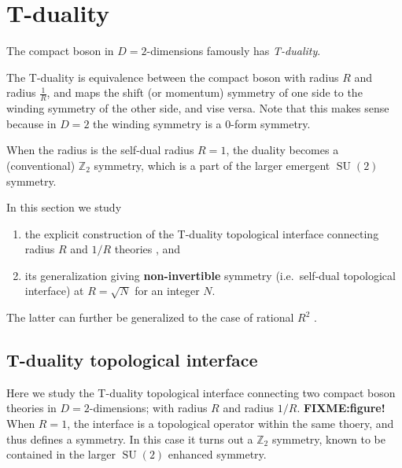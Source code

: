 \documentclass[
  letterpaper,
  DIV=11,
  numbers=noendperiod]{scrreport}
\providecommand{\tightlist}{%
  \setlength{\itemsep}{0pt}\setlength{\parskip}{0pt}}\usepackage{longtable,booktabs,array}
\DeclareMathOperator{\SU}{SU}
\newcommand{\stdim}{D}
\begin{document}
\hypertarget{t-duality}{%
\section{T-duality}\label{t-duality}}

The compact boson in \(\stdim=2\)-dimensions famously has
\emph{T-duality}.

The T-duality is equivalence between the compact boson with radius \(R\)
and radius \(\frac{1}{R}\), and maps the shift (or momentum) symmetry of
one side to the winding symmetry of the other side, and vise versa. Note
that this makes sense because in \(\stdim=2\) the winding symmetry is a
0-form symmetry.

When the radius is the self-dual radius \(R=1\), the duality becomes a
(conventional) \(\mathbb{Z}_2\) symmetry, which is a part of the larger
emergent \(\SU(2)\) symmetry.

In this section we study

\begin{enumerate}
\def\labelenumi{\arabic{enumi}.}
\tightlist
\item
  the explicit construction of the T-duality topological interface
  connecting radius \(R\) and \(1/R\) theories
  \autocite{Kapustin:2009av}, and
\item
  its generalization giving \textbf{non-invertible} symmetry
  (i.e.~self-dual topological interface) at \(R=\sqrt{N}\) for an
  integer \(N\).
\end{enumerate}

The latter can further be generalized to the case of rational \(R^2\)
\autocite{Niro:2022ctq,Cordova:2023ent}.

\hypertarget{t-duality-topological-interface}{%
\subsection{T-duality topological
interface}\label{t-duality-topological-interface}}

Here we study the T-duality topological interface connecting two compact
boson theories in \(\stdim=2\)-dimensions; with radius \(R\) and radius
\(1/R\). \textbf{FIXME:figure!} When \(R=1\), the interface is a
topological operator within the same thoery, and thus defines a
symmetry. In this case it turns out a \(\mathbb{Z}_2\) symmetry, known
to be contained in the larger \(\SU(2)\) enhanced symmetry.
\end{document}
